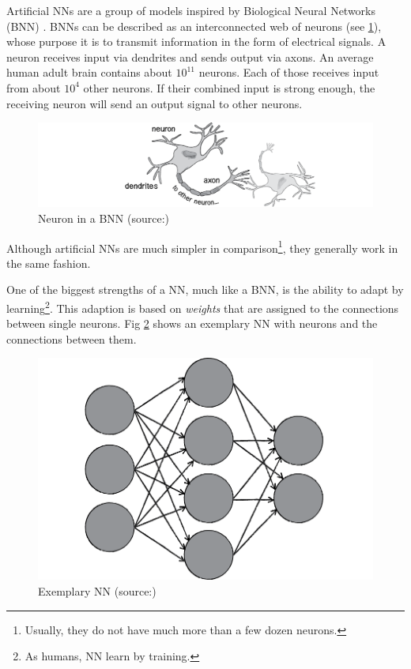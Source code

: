 Artificial NNs are a group of models inspired by Biological Neural Networks (BNN) . BNNs can be described as an interconnected web of neurons (see \ref{fig2_bnn}), whose purpose it is to transmit information in the form of electrical signals. A neuron receives input via dendrites and sends output via axons\cite{Shiffman12}. An average human adult brain contains about $10^{11}$ neurons. Each of those receives input from about $10^4$ other neurons. If their combined input is strong enough, the receiving neuron will send an output signal to other neurons\cite{Bourg04}.

\begin{figure}[H]
	\begin{center}
		\includegraphics[scale=0.7]{img/bnn.png}
		\caption{Neuron in a BNN (source:\cite{Shiffman12})}
		\label{fig2_bnn}
	\end{center}
\end{figure}

Although artificial NNs are much simpler in comparison\footnote{Usually, they do not have much more than a few dozen neurons\cite{Bourg04}.}, they generally work in the same fashion.

One of the biggest strengths of a NN, much like a BNN, is the ability to adapt by learning\footnote{As humans, NN learn by training\cite{Shiffman12}.}. This adaption is based on \emph{weights} that are assigned to the connections between single neurons. Fig \ref{fig2_nn} shows an exemplary NN with neurons and the connections between them.

\begin{figure}[H]
	\begin{center}
		\includegraphics[scale=1.0]{img/NN.png}
		\caption{Exemplary NN (source:\cite{Shiffman12})}
		\label{fig2_nn}
	\end{center}
\end{figure}

